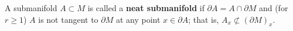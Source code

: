 A submanifold $A \subset M$ is called a \textbf{neat submanifold} if $\partial A = A \cap \partial M$ and (for $r \geqslant 1$) $A$ is not tangent to $\partial M$ at any point $x \in \partial A$; that is, $A_x \not\subset (\partial M)_x$.
